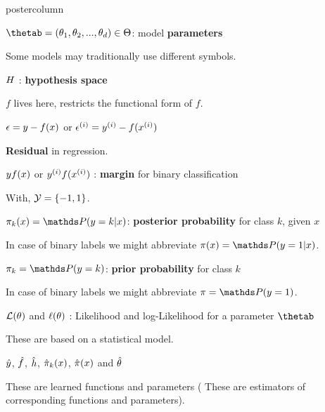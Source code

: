 \documentclass{beamer}
\begin{document}
\begin{frame}[fragile]{}
\begin{columns}
\begin{column}{.31\textwidth}
\begin{beamercolorbox}[center]{postercolumn}
\begin{minipage}{.98\textwidth}
{\begin{myblock}{}
						\begin{codebox}
							$\thetab = (\theta_1, \theta_2, ..., \theta_d) \in \Theta$: 
							model \textbf{parameters}
						\end{codebox}
						\hspace*{1ex}Some models may traditionally use different symbols.
						
						\begin{codebox}
							$H$ : \textbf{hypothesis space}
						\end{codebox}
						\hspace*{1ex}$f$ lives here, restricts the functional form of $f$.
						
						\begin{codebox}
				            $\epsilon = y - f(x)$ or $\epsilon^{(i)} = y^{(i)} - f(x^{(i)})$
						\end{codebox}
						\hspace*{1ex}\textbf{Residual} in regression.
						
						\begin{codebox}
				             $y f(x)$ or $y^{(i)} f(x^{(i)})$ : \textbf{margin} for binary classification
						\end{codebox}
						\hspace*{1ex}With, $\mathcal{Y} = \{-1, 1\}$.
						
						\begin{codebox} $\pikx = \postk$: \textbf{posterior probability} for class $k$, given $x$
						\end{codebox}
						\hspace*{1ex}In case of binary labels we might abbreviate $\pix = \post$.
						
						\begin{codebox}
						$\pi_k = \P(y = k)$:\textbf{ prior probability} for class $k$
						\end{codebox}
						\hspace*{1ex}In case of binary labels we might abbreviate $\pi = \P(y = 1)$.
						
						\begin{codebox}
						$\mathcal{L}(\theta)$ and $\ell(\theta)$ : Likelihood and log-Likelihood for a parameter $\thetab$
						\end{codebox}
						\hspace*{1ex}These are based on a statistical model.
						
						\begin{codebox}
						 $\hat{y}$, $\hat{f}$, $\hat{h}$, $\hat \pi_k(x)$, $\hat \pi(x)$ and $\hat{\theta}$
						\end{codebox}
						\hspace*{1ex}These are learned functions and parameters ( These are estimators of \hspace*{1ex}corresponding functions and parameters).\\
						

\end{myblock}}
\end{minipage}
\end{beamercolorbox}
\end{column}
\end{columns}
\end{frame}
\end{document}
